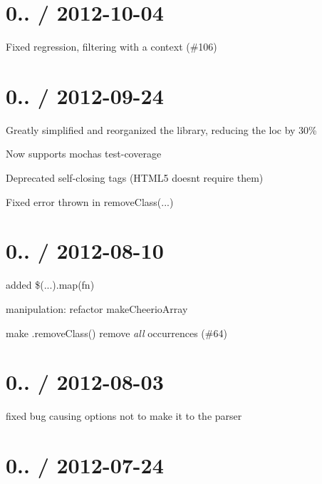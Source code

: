\section*{0.. / 2012-\/10-\/04 }


\begin{DoxyItemize}
\item Fixed regression, filtering with a context (\#106)
\end{DoxyItemize}

\section*{0.. / 2012-\/09-\/24 }


\begin{DoxyItemize}
\item Greatly simplified and reorganized the library, reducing the loc by 30\%
\item Now supports mocha\textquotesingle{}s test-\/coverage
\item Deprecated self-\/closing tags (H\+T\+M\+L5 doesn\textquotesingle{}t require them)
\item Fixed error thrown in remove\+Class(...) 
\end{DoxyItemize}

\section*{0.. / 2012-\/08-\/10 }


\begin{DoxyItemize}
\item added \$(...).map(fn)
\item manipulation\+: refactor {\ttfamily make\+Cheerio\+Array}
\item make .remove\+Class() remove {\itshape all} occurrences (\#64)
\end{DoxyItemize}

\section*{0.. / 2012-\/08-\/03 }


\begin{DoxyItemize}
\item fixed bug causing options not to make it to the parser
\end{DoxyItemize}

\section*{0.. / 2012-\/07-\/24 }


